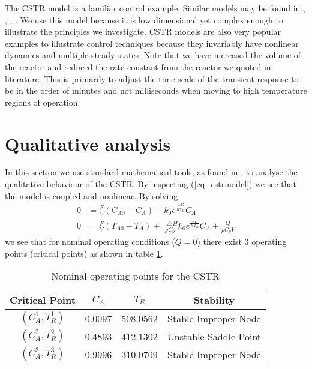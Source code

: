 The CSTR model is a familiar control example. Similar models may be found in \cite{du}, \cite{cervantes}, \cite{pan}, \cite{yazdi}. We use this model because it is low dimensional yet complex enough to illustrate the principles we investigate. CSTR models are also very popular examples to illustrate control techniques because they invariably have nonlinear dynamics and multiple steady states. Note that we have increased the volume of the reactor and reduced the rate constant from the reactor we quoted in literature. This is primarily to adjust the time scale of the transient response to be in the order of minutes and not milliseconds when moving to high temperature regions of operation.

\section{Qualitative analysis}
In this section we use standard mathematical tools, as found in \cite{edwardsandpenny}, to analyse the qualitative behaviour of the CSTR. By inspecting (\ref{eq_cstrmodel}) we see that the model is coupled and nonlinear. By solving
\begin{equation}
\begin{aligned}
0 &= \frac{F}{V}\left( C_{A0}-C_A \right) - k_0e^{\frac{-E}{RT_R}}C_A \\
0 &= \frac{F}{V}\left(T_{A0}-T_A\right) + \frac{-\triangle H}{\rho C_p}k_0e^{\frac{-E}{RT_R}}C_A + \frac{Q}{\rho C_p V}
\end{aligned}
\label{eq_cstr_statpoints}
\end{equation}
we see that for nominal operating conditions ($Q = 0$) there exist 3 operating points (critical points) as shown in table \ref{tab_nominalstats}.
\begin{table}[H]
\begin{center}
\begin{tabular}{c c c c}
\hline
Critical Point & $C_A$ & $T_R$ & Stability\\
\hline
$\left(C_A^1, T_R^1\right)$ & 0.0097 & 508.0562 & Stable Improper Node\\
$\left(C_A^2, T_R^2\right)$ & 0.4893 & 412.1302 & Unstable Saddle Point \\
$\left(C_A^3, T_R^3 \right)$ & 0.9996 & 310.0709 & Stable Improper Node \\
\hline
\end{tabular}
\caption{Nominal operating points for  the CSTR}
\label{tab_nominalstats}
\end{center}
\end{table}
